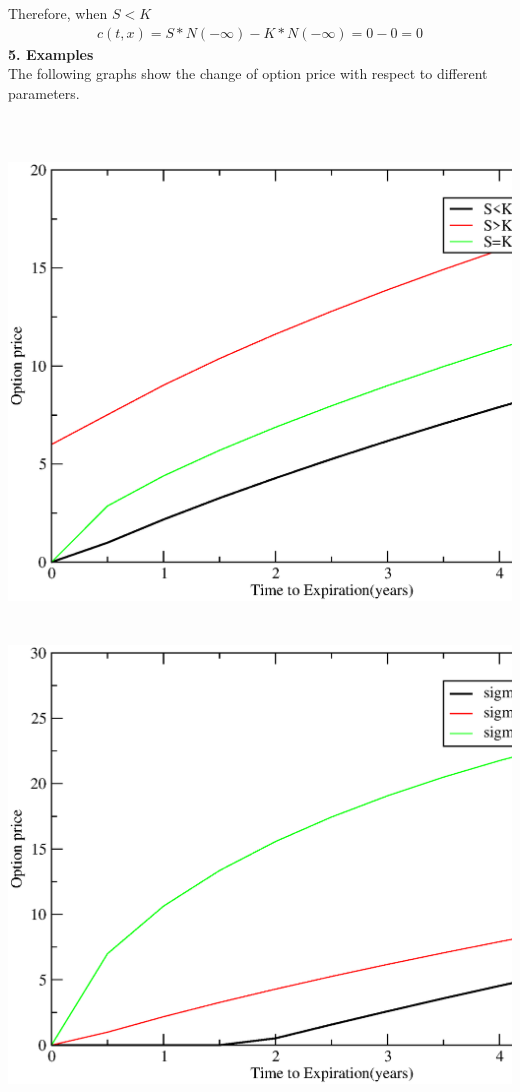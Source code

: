 \documentclass[a4paper]{article}
\begin{document}
Therefore, when $S<K$
\begin{align*}
	c(t,x) = S*N(-\infty) - K*N(-\infty) = 0-0 = 0
\end{align*}
{\bf 5. Examples}\\
The following graphs show the change of option price with respect to different parameters.
\\
\\
\\
\\
\includegraphics[scale = 0.5]{option_price1.eps}\\
\\
\\
\includegraphics[scale = 0.5]{option_price2.eps}\\
\end{document}
